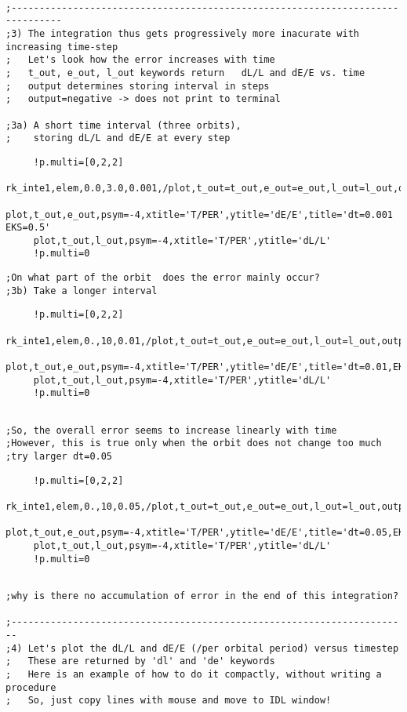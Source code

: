 \documentclass[a4paper,12pt]{article}
\def\red{\color{red}}
\def\black{\color{RGBblack}}
\begin{document}
\newpage
\black
\begin{verbatim}

;-------------------------------------------------------------------------------
;3) The integration thus gets progressively more inacurate with increasing time-step
;   Let's look how the error increases with time
;   t_out, e_out, l_out keywords return   dL/L and dE/E vs. time
;   output determines storing interval in steps
;   output=negative -> does not print to terminal

;3a) A short time interval (three orbits),
;    storing dL/L and dE/E at every step 
\end{verbatim}
\red
\begin{verbatim}
     !p.multi=[0,2,2]
     rk_inte1,elem,0.0,3.0,0.001,/plot,t_out=t_out,e_out=e_out,l_out=l_out,output=-1
     plot,t_out,e_out,psym=-4,xtitle='T/PER',ytitle='dE/E',title='dt=0.001 EKS=0.5'
     plot,t_out,l_out,psym=-4,xtitle='T/PER',ytitle='dL/L'
     !p.multi=0
\end{verbatim}
\black
\begin{verbatim}
;On what part of the orbit  does the error mainly occur?
;3b) Take a longer interval
\end{verbatim}
\red
\begin{verbatim}
     !p.multi=[0,2,2]
     rk_inte1,elem,0.,10,0.01,/plot,t_out=t_out,e_out=e_out,l_out=l_out,output=-20
     plot,t_out,e_out,psym=-4,xtitle='T/PER',ytitle='dE/E',title='dt=0.01,EKS=0.5'
     plot,t_out,l_out,psym=-4,xtitle='T/PER',ytitle='dL/L'
     !p.multi=0
\end{verbatim}
\black
\begin{verbatim}

;So, the overall error seems to increase linearly with time
;However, this is true only when the orbit does not change too much
;try larger dt=0.05   

\end{verbatim}
\red
\begin{verbatim}
     !p.multi=[0,2,2]
     rk_inte1,elem,0.,10,0.05,/plot,t_out=t_out,e_out=e_out,l_out=l_out,output=4,/connect
     plot,t_out,e_out,psym=-4,xtitle='T/PER',ytitle='dE/E',title='dt=0.05,EKS=0.5'
     plot,t_out,l_out,psym=-4,xtitle='T/PER',ytitle='dL/L'
     !p.multi=0

\end{verbatim}
\black
\begin{verbatim}

;why is there no accumulation of error in the end of this integration?

;-----------------------------------------------------------------------
;4) Let's plot the dL/L and dE/E (/per orbital period) versus timestep
;   These are returned by 'dl' and 'de' keywords   
;   Here is an example of how to do it compactly, without writing a procedure
;   So, just copy lines with mouse and move to IDL window!

\end{verbatim}
\end{document}

